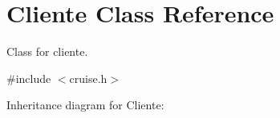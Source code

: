 \hypertarget{classCliente}{}\section{Cliente Class Reference}
\label{classCliente}


Class for cliente.  




{\ttfamily \#include $<$cruise.\+h$>$}



Inheritance diagram for Cliente\+:
